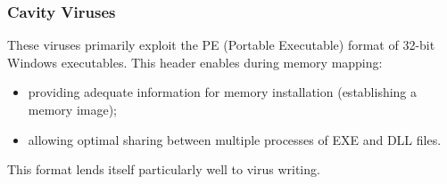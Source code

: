 \documentclass{beamer}
\begin{document}
\begin{frame}
\frametitle{Cavity Viruses}
These viruses primarily exploit the PE (Portable Executable) format of 32-bit Windows executables. This header enables during memory mapping:
\begin{itemize}
\item providing adequate information for memory installation (establishing a memory image);
\item allowing optimal sharing between multiple processes of EXE and DLL files.
\end{itemize}
This format lends itself particularly well to virus writing.
\end{frame}











\end{document}
